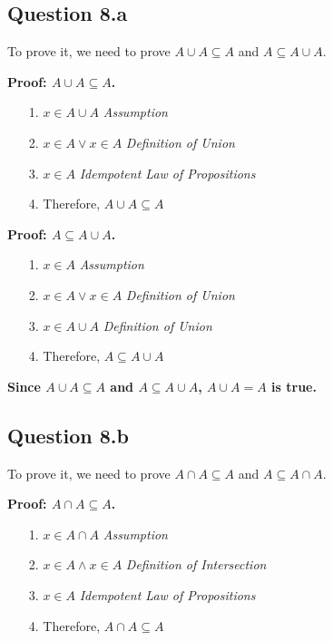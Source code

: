 \documentclass{article}
\begin{document}
\subsection*{Question 8.a}
To prove it, we need to prove $A \cup A \subseteq A$ and $A \subseteq A \cup A$.

\textbf{Proof: $A \cup A \subseteq A$.}
\begin{itemize}
    \item[1.] \( x \in A \cup A \) \hfill \textit{Assumption}
    \item[2.] \( x \in A \lor x \in A \) \hfill \textit{Definition of Union}
    \item[3.] \( x \in A \) \hfill \textit{Idempotent Law of Propositions}
    \item[4.] Therefore, $A \cup A \subseteq A$
\end{itemize}

\textbf{Proof: $A \subseteq A \cup A$.}
\begin{itemize}
    \item[1.] \( x \in A \) \hfill \textit{Assumption}
    \item[2.] \( x \in A \lor x \in A \) \hfill \textit{Definition of Union}
    \item[3.] \( x \in A \cup A \) \hfill \textit{Definition of Union}
    \item[4.] Therefore, $A \subseteq A \cup A$
\end{itemize}

\textbf{Since $A \cup A \subseteq A$ and $A \subseteq A \cup A$, $A \cup A = A$ is true.}

\subsection*{Question 8.b}
To prove it, we need to prove $A \cap A \subseteq A$ and $A \subseteq A \cap A$.

\textbf{Proof: $A \cap A \subseteq A$.}
\begin{itemize}
    \item[1.] \( x \in A \cap A \) \hfill \textit{Assumption}
    \item[2.] \( x \in A \land x \in A \) \hfill \textit{Definition of Intersection}
    \item[3.] \( x \in A \) \hfill \textit{Idempotent Law of Propositions}
    \item[4.] Therefore, $A \cap A \subseteq A$
\end{itemize}
\end{document}
